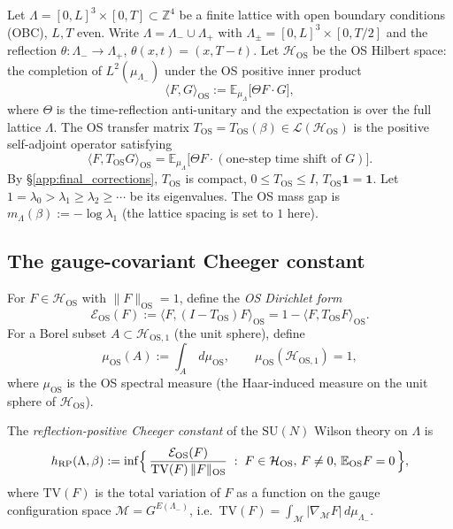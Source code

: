 Let $\Lambda=[0,L]^{3}\times[0,T]\subset\mathbb{Z}^{4}$ be a finite
lattice with open boundary conditions (OBC), $L,T$ even. Write
$\Lambda=\Lambda_{-}\cup\Lambda_{+}$ with
$\Lambda_{\pm}=[0,L]^{3}\times[0,T/2]$ and the reflection
$\theta:\Lambda_{-}\to\Lambda_{+}$, $\theta(x,t)=(x,T-t)$.
Let $\mathcal{H}_{\mathrm{OS}}$ be the OS Hilbert space: the
completion of $L^{2}(\mu_{\Lambda_{-}})$ under the OS positive
inner product
\[
  \langle F,G\rangle_{\mathrm{OS}}
  := \mathbb{E}_{\mu_{\Lambda}}\!\bigl[
    \Theta F\cdot G
  \bigr],
\]
where $\Theta$ is the time-reflection anti-unitary and the
expectation is over the full lattice $\Lambda$. The OS transfer
matrix $T_{\mathrm{OS}}=T_{\mathrm{OS}}(\beta)\in\mathcal{L}(\mathcal{H}_{\mathrm{OS}})$
is the positive self-adjoint operator satisfying
\[
  \langle F,T_{\mathrm{OS}}G\rangle_{\mathrm{OS}}
  = \mathbb{E}_{\mu_{\Lambda}}\!\bigl[
    \Theta F\cdot(\text{one-step time shift of }G)
  \bigr].
\]
By \S\ref{app:final_corrections}, $T_{\mathrm{OS}}$ is compact,
$0\le T_{\mathrm{OS}}\le I$, $T_{\mathrm{OS}}\mathbf{1}=\mathbf{1}$.
Let $1=\lambda_{0}>\lambda_{1}\ge\lambda_{2}\ge\cdots$ be its
eigenvalues. The OS mass gap is
$m_{\Lambda}(\beta):=-\log\lambda_{1}$ (the lattice spacing is
set to $1$ here).

\subsection{The gauge-covariant Cheeger constant}
\label{ssec:rp_cheeger_const}

For $F\in\mathcal{H}_{\mathrm{OS}}$ with $\|F\|_{\mathrm{OS}}=1$,
define the \emph{OS Dirichlet form}
\[
  \mathcal{E}_{\mathrm{OS}}(F)
  := \langle F,(I-T_{\mathrm{OS}})F\rangle_{\mathrm{OS}}
  = 1-\langle F,T_{\mathrm{OS}}F\rangle_{\mathrm{OS}}.
\]
For a Borel subset $A\subset\mathcal{H}_{\mathrm{OS},1}$ (the unit
sphere), define
\[
  \mu_{\mathrm{OS}}(A)
  := \int_{A}\,d\mu_{\mathrm{OS}},\qquad
  \mu_{\mathrm{OS}}(\mathcal{H}_{\mathrm{OS},1})=1,
\]
where $\mu_{\mathrm{OS}}$ is the OS spectral measure (the
Haar-induced measure on the unit sphere of $\mathcal{H}_{\mathrm{OS}}$).

\begin{definition}
\label{def:h_RP}
The \emph{reflection-positive Cheeger constant} of the
$\mathrm{SU}(N)$ Wilson theory on $\Lambda$ is
\begin{equation}
\label{eq:h_RP_def}
  h_{\mathrm{RP}}(\Lambda,\beta)
  := \inf\Bigl\{\,
    \frac{\mathcal{E}_{\mathrm{OS}}(F)}
         {\mathrm{TV}(F)\,\|F\|_{\mathrm{OS}}}
    \;:\;
    F\in\mathcal{H}_{\mathrm{OS}},\,F\ne 0,\,\mathbb{E}_{\mathrm{OS}}F=0
  \,\Bigr\},
\end{equation}
where $\mathrm{TV}(F)$ is the total variation of $F$ as a function
on the gauge configuration space $\mathcal{M}=G^{E(\Lambda_{-})}$,
i.e.\ $\mathrm{TV}(F)=\int_{\mathcal{M}}|\nabla_{\mathcal{M}}F|\,d\mu_{\Lambda_{-}}$.
\end{definition}

